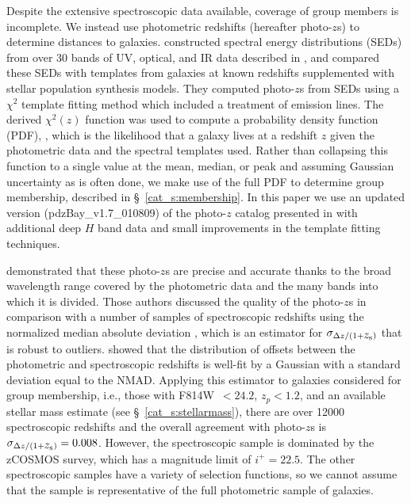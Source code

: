 Despite the extensive spectroscopic data available, coverage of group
members is incomplete. We instead use photometric redshifts (hereafter
photo-$z$s) to determine distances to galaxies. \citet{Ilbert2009} constructed spectral energy
distributions (SEDs) from over 30 bands of UV, optical,
and IR data described in \citet{Capak2007b}, and compared these SEDs
with templates from galaxies at known redshifts supplemented with
stellar population synthesis models. They computed photo-$z$s
from SEDs using a $\chi^2$ template fitting method which included a
treatment of emission lines. The derived $\chi^2(z)$ function was used
to compute a probability density function (PDF), \pz, which is the
likelihood that a galaxy lives at a redshift $z$ given the photometric
data and the spectral templates used. Rather than collapsing this
function to a single value at the mean, median, or peak and assuming
Gaussian uncertainty as is often done, we make use of the full PDF to
determine group membership, described in \S~\ref{cat_s:membership}. 
In this paper we use an updated version (pdzBay\_v1.7\_010809) of the
photo-$z$ catalog presented in \citet{Ilbert2009} with additional deep
$H$ band data and small improvements in the template fitting
techniques.

\citet{Ilbert2009} demonstrated that these photo-$z$s are precise and
accurate thanks to the broad wavelength range covered by the
photometric data and the many bands into which it is divided.
Those authors discussed the quality of the photo-$z$s in comparison with
a number of samples of spectroscopic redshifts using the
normalized median absolute deviation \citep[NMAD $=1.48 \times$
median$(|\zs-\zp|/(1+\zs))$; ][]{Hoaglin1983}, which is an estimator for
$\sigma_{\Delta z/(1+\mbox{$z_{\rm s}$})}$ that is robust to
outliers. \citet{Ilbert2009} showed that the distribution of offsets
between the photometric and spectroscopic redshifts is well-fit by a
Gaussian with a standard deviation equal to the NMAD. Applying this
estimator to galaxies considered for group membership, i.e., those
with F814W~$<24.2$, $z_{p}<1.2$, and an available stellar mass estimate (see
\S~\ref{cat_s:stellarmass}), there are over 12000 spectroscopic redshifts
and the overall agreement with photo-$z$s is $\sigma_{\Delta z/(1+\mbox{$z_{\rm s}$})} =
0.008$. However, the spectroscopic sample is dominated by the
zCOSMOS survey, which has a magnitude limit of
$i^+=22.5$. The other spectroscopic samples have a variety of
selection functions, so we cannot assume that the sample is
representative of the full photometric sample of galaxies.


